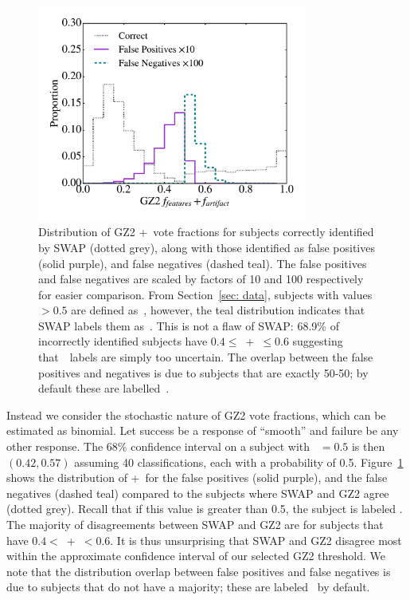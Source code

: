 \begin{figure}
\includegraphics[width=3.5in]{Figures/human_machine/f5.pdf}
\caption[SWAP's prediction disagrees with the GZ2 label as a result of the confidence interval around the chosen threshold used to define the GZ2 label.]{Distribution of GZ2 \ffeat+\fstar~vote fractions for subjects correctly identified by SWAP (dotted grey), along with those identified as false positives (solid purple), and false negatives (dashed teal). 
The false positives and false negatives are scaled by factors of 10 and 100 respectively for easier comparison. From Section~\ref{sec: data}, subjects with values $> 0.5$ are defined as~\feat, however, the teal distribution indicates that SWAP labels them as~\notfeat. This is not a flaw of SWAP: 68.9\% of incorrectly identified subjects have $0.4 \le $~\ffeat +\fstar~$ \le 0.6$ suggesting that~\raw~labels are simply too uncertain. The overlap between the false positives and negatives is due to subjects that are exactly 50-50; by default these are labelled~\notfeat.}
\label{fig: SWAP sucks}
\end{figure}

Instead we consider the stochastic nature of GZ2 vote fractions, which can be estimated as binomial. Let success be a response of ``smooth'' and failure be any other response. The $68\%$ confidence interval on a subject with \fsmooth~$=0.5$ is then $(0.42, 0.57)$ assuming 40 classifications, each with a probability of 0.5. Figure~\ref{fig: SWAP sucks} shows the distribution of \ffeat+\fstar~for the false positives (solid purple), and the false negatives (dashed teal) compared to the  subjects where SWAP and GZ2 agree (dotted grey).  Recall that if this value is greater than 0.5, the subject is labeled \feat. The majority of disagreements between SWAP and GZ2 are for subjects that have $0.4 <$~\ffeat+\fstar~$< 0.6$. It is thus unsurprising that SWAP and GZ2 disagree most within the approximate confidence interval of our selected GZ2 threshold. We note that the distribution overlap between false positives and false negatives is due to subjects that do not have a majority; these are labeled \notfeat~by default. 

